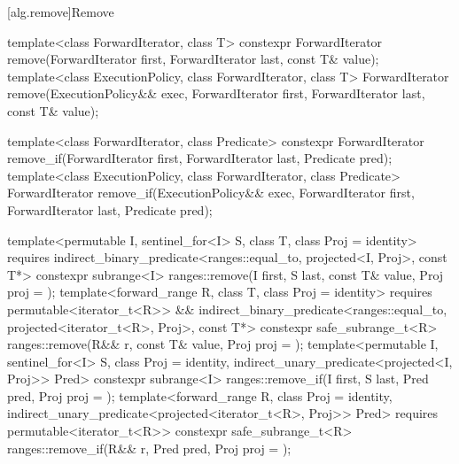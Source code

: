 [alg.remove]{Remove}

%
%
\begin{itemdecl}
template<class ForwardIterator, class T>
  constexpr ForwardIterator remove(ForwardIterator first, ForwardIterator last,
                                   const T& value);
template<class ExecutionPolicy, class ForwardIterator, class T>
  ForwardIterator remove(ExecutionPolicy&& exec,
                         ForwardIterator first, ForwardIterator last,
                         const T& value);

template<class ForwardIterator, class Predicate>
  constexpr ForwardIterator remove_if(ForwardIterator first, ForwardIterator last,
                                      Predicate pred);
template<class ExecutionPolicy, class ForwardIterator, class Predicate>
  ForwardIterator remove_if(ExecutionPolicy&& exec,
                            ForwardIterator first, ForwardIterator last,
                            Predicate pred);

template<permutable I, sentinel_for<I> S, class T, class Proj = identity>
  requires indirect_binary_predicate<ranges::equal_to, projected<I, Proj>, const T*>
  constexpr subrange<I> ranges::remove(I first, S last, const T& value, Proj proj = {});
template<forward_range R, class T, class Proj = identity>
  requires permutable<iterator_t<R>> &&
           indirect_binary_predicate<ranges::equal_to, projected<iterator_t<R>, Proj>, const T*>
  constexpr safe_subrange_t<R>
    ranges::remove(R&& r, const T& value, Proj proj = {});
template<permutable I, sentinel_for<I> S, class Proj = identity,
         indirect_unary_predicate<projected<I, Proj>> Pred>
  constexpr subrange<I> ranges::remove_if(I first, S last, Pred pred, Proj proj = {});
template<forward_range R, class Proj = identity,
         indirect_unary_predicate<projected<iterator_t<R>, Proj>> Pred>
  requires permutable<iterator_t<R>>
  constexpr safe_subrange_t<R>
    ranges::remove_if(R&& r, Pred pred, Proj proj = {});
\end{itemdecl}

